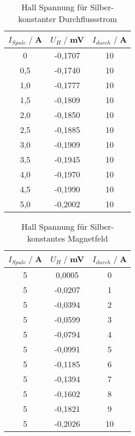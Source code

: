 \begin{table}
    \centering
    \begin{tabular}{c c c}
        \toprule
        $I_{Spule} \;/\;$A & $U_H\;/\;$mV & $I_{durch} \;/\;$A\\
        \midrule
            0                   &-0,1707&             10\\
            0,5                 &-0,1740&             10\\
            1,0                 &-0,1777&             10\\
            1,5                 &-0,1809&             10\\
            2,0                 &-0,1850&             10\\
            2,5                 &-0,1885&             10\\
            3,0                 &-0,1909&             10\\
            3,5                 &-0,1945&             10\\
            4,0                 &-0,1970&             10\\
            4,5                 &-0,1990&             10\\
            5,0                 &-0,2002&             10\\
       \bottomrule
    \end{tabular}
    \caption{Hall Spannung für Silber- konstanter Durchflussstrom}
    \label{tab:Ag_I}
\end{table}

\begin{table}
    \centering
    \begin{tabular}{c c c}
        \toprule
        $I_{Spule} \;/\;$A & $U_H\;/\;$mV & $I_{durch} \;/\;$A\\
        \midrule
  5                   &0,0005&              0\\
  5                   &-0,0207&             1\\
  5                   &-0,0394&             2\\
  5                   &-0,0599&             3\\
  5                   &-0,0794&             4\\
  5                   &-0,0991&             5\\
  5                   &-0,1185&             6\\
  5                   &-0,1394&             7\\
  5                   &-0,1602&             8\\
  5                   &-0,1821&             9\\
  5                   &-0,2026&             10\\

       \bottomrule
    \end{tabular}
    \caption{Hall Spannung für Silber- konstantes Magnetfeld}
    \label{tab:Ag_I}
\end{table}


\label{sec:Auswertung}
